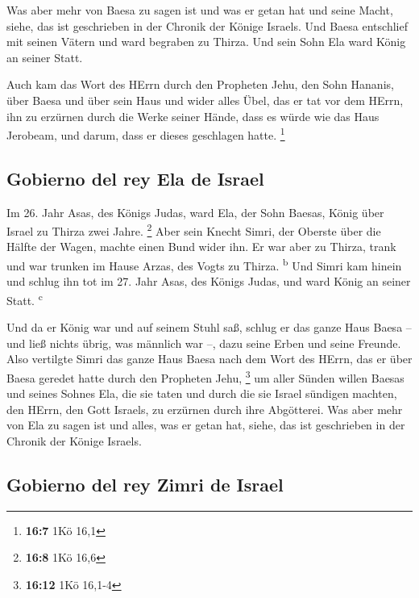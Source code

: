  Was aber mehr von Baesa zu sagen ist und was er getan hat
und seine Macht, siehe, das ist geschrieben in der Chronik der Könige
Israels.  Und Baesa entschlief mit seinen Vätern und ward
begraben zu Thirza. Und sein Sohn Ela ward König an seiner Statt.

 Auch kam das Wort des HErrn durch den Propheten Jehu, den
Sohn Hananis, über Baesa und über sein Haus und wider alles Übel, das er
tat vor dem HErrn, ihn zu erzürnen durch die Werke seiner Hände, dass es
würde wie das Haus Jerobeam, und darum, dass er dieses geschlagen hatte.
\footnote{\textbf{16:7} 1Kö 16,1}

\hypertarget{gobierno-del-rey-ela-de-israel}{%
\subsection{Gobierno del rey Ela de
Israel}\label{gobierno-del-rey-ela-de-israel}}

 Im 26. Jahr Asas, des Königs Judas, ward Ela, der Sohn
Baesas, König über Israel zu Thirza zwei Jahre. \footnote{\textbf{16:8}
  1Kö 16,6}  Aber sein Knecht Simri, der Oberste über die
Hälfte der Wagen, machte einen Bund wider ihn. Er war aber zu Thirza,
trank und war trunken im Hause Arzas, des Vogts zu Thirza.
\textsuperscript{b}  Und Simri kam hinein und schlug ihn
tot im 27. Jahr Asas, des Königs Judas, und ward König an seiner Statt.
\textsuperscript{c}

 Und da er König war und auf seinem Stuhl saß, schlug er
das ganze Haus Baesa -- und ließ nichts übrig, was männlich war --, dazu
seine Erben und seine Freunde.  Also vertilgte Simri das
ganze Haus Baesa nach dem Wort des HErrn, das er über Baesa geredet
hatte durch den Propheten Jehu, \footnote{\textbf{16:12} 1Kö 16,1-4}
 um aller Sünden willen Baesas und seines Sohnes Ela, die
sie taten und durch die sie Israel sündigen machten, den HErrn, den Gott
Israels, zu erzürnen durch ihre Abgötterei.  Was aber
mehr von Ela zu sagen ist und alles, was er getan hat, siehe, das ist
geschrieben in der Chronik der Könige Israels.

\hypertarget{gobierno-del-rey-zimri-de-israel}{%
\subsection{Gobierno del rey Zimri de
Israel}\label{gobierno-del-rey-zimri-de-israel}}

